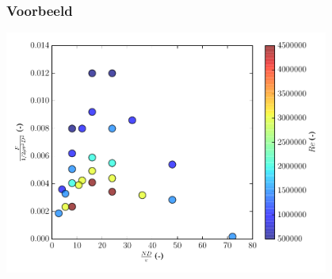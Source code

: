 \documentclass[t]{beamer}
\begin{document}
	\begin{frame}
		\frametitle{Voorbeeld}
		\includegraphics[height=8cm]{fig/gelijkvormigheid/Dimensieanalyse_voorbeeld_data_dimensieloos}
	\end{frame}	
\end{document}
